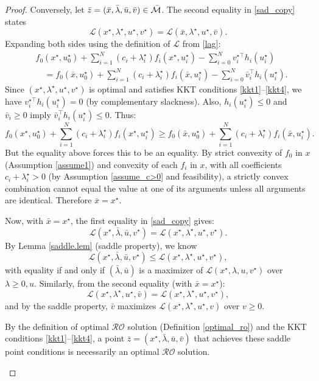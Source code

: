 \documentclass[journal,twoside,web]{ieeecolor}
\newcommand{\purpletext}[1]{\textcolor{proofpurple}{#1}}
\begin{document}
\begin{proof}
\purpletext{Conversely, let $\bar{z} = (\bar{x}, \bar{\lambda}, \bar{u}, \bar{v}) \in \bar{\cal M}$. The second equality in \eqref{sad_copy} states
\[
\mathcal{L}(x^\star,\lambda^\star,u^\star,v^\star) = \mathcal{L}(\bar{x},\lambda^\star,u^\star,\bar{v}).
\]
Expanding both sides using the definition of $\mathcal{L}$ from \eqref{lag}:
\begin{align*}
&f_0(x^\star, u_0^\star) + \sum_{i=1}^N (c_i + \lambda_i^\star) f_i(x^\star, u_i^\star) - \sum_{i=0}^N v_i^{\star\top} h_i(u_i^\star)\\
&\quad = f_0(\bar{x}, u_0^\star) + \sum_{i=1}^N (c_i + \lambda_i^\star) f_i(\bar{x}, u_i^\star) - \sum_{i=0}^N \bar{v}_i^\top h_i(u_i^\star).
\end{align*}
Since $(x^\star, \lambda^\star, u^\star, v^\star)$ is optimal and satisfies KKT conditions \eqref{kkt1}--\eqref{kkt4}, we have $v_i^{\star\top} h_i(u_i^\star) = 0$ (by complementary slackness). Also, $h_i(u_i^\star) \leq 0$ and $\bar{v}_i \geq 0$ imply $\bar{v}_i^\top h_i(u_i^\star) \leq 0$. Thus:
\[
f_0(x^\star, u_0^\star) + \sum_{i=1}^N (c_i + \lambda_i^\star) f_i(x^\star, u_i^\star) \geq f_0(\bar{x}, u_0^\star) + \sum_{i=1}^N (c_i + \lambda_i^\star) f_i(\bar{x}, u_i^\star).
\]
But the equality above forces this to be an equality. By strict convexity of $f_0$ in $x$ (Assumption \ref{assume1}) and convexity of each $f_i$ in $x$, with all coefficients $c_i + \lambda_i^\star > 0$ (by Assumption \ref{assume_c>0} and feasibility), a strictly convex combination cannot equal the value at one of its arguments unless all arguments are identical. Therefore $\bar{x} = x^\star$.}

\purpletext{Now, with $\bar{x} = x^\star$, the first equality in \eqref{sad_copy} gives:
\[
\mathcal{L}(x^\star,\bar{\lambda},\bar{u},v^\star) = \mathcal{L}(x^\star,\lambda^\star,u^\star,v^\star).
\]
By Lemma \ref{saddle.lem} (saddle property), we know
\[
\mathcal{L}(x^\star,\bar{\lambda},\bar{u},v^\star) \leq \mathcal{L}(x^\star,\lambda^\star,u^\star,v^\star),
\]
with equality if and only if $(\bar{\lambda}, \bar{u})$ is a maximizer of $\mathcal{L}(x^\star, \lambda, u, v^\star)$ over $\lambda \geq 0, u$. Similarly, from the second equality (with $\bar{x} = x^\star$):
\[
\mathcal{L}(x^\star,\lambda^\star,u^\star,\bar{v}) = \mathcal{L}(x^\star,\lambda^\star,u^\star,v^\star),
\]
and by the saddle property, $\bar{v}$ maximizes $\mathcal{L}(x^\star, \lambda^\star, u^\star, v)$ over $v \geq 0$.

By the definition of optimal $\mathcal{RO}$ solution (Definition \ref{optimal_ro}) and the KKT conditions \eqref{kkt1}--\eqref{kkt4}, a point $\bar{z} = (x^\star, \bar{\lambda}, \bar{u}, \bar{v})$ that achieves these saddle point conditions is necessarily an optimal $\mathcal{RO}$ solution.}


\end{proof}
\end{document}
